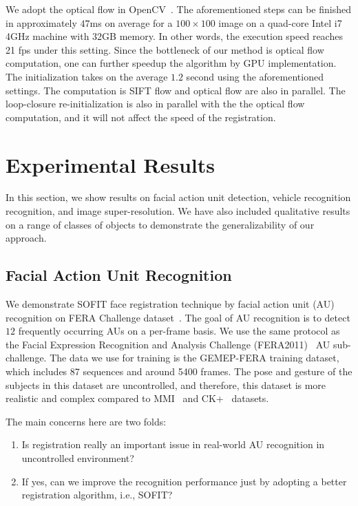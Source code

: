 \documentclass[10pt,journal]{IEEEtran}
\begin{document}
We adopt the optical flow in OpenCV~\cite{opencv}. \textcolor[rgb]{1,0,0}{The aforementioned steps can be finished in approximately $47$ms on average for a $100\times100$ image on a quad-core Intel i7 4GHz machine with 32GB memory. In other words, the execution speed reaches 21 fps under this setting. }Since the bottleneck of our method is optical flow computation, one can further speedup the algorithm by GPU implementation. The initialization takes on the average \textcolor[rgb]{1,0,0}{$1.2$} second using the aforementioned settings. The computation is SIFT flow and optical flow are also in parallel. The loop-closure re-initialization is also in parallel with the the optical flow computation, and it will not affect the speed of the registration. 


\section{\label{sec:experiment}Experimental Results}

\textcolor[rgb]{1,0,0}{In this section, we show results on facial action unit detection, vehicle recognition recognition, and image super-resolution. We have also included qualitative results on a range of classes of objects to demonstrate the generalizability of our approach.}

\subsection{Facial Action Unit Recognition}

We demonstrate SOFIT face registration technique by facial action unit (AU) recognition on FERA Challenge dataset~\cite{FERA11}. The goal of AU recognition is to detect $12$ frequently occurring AUs on a per-frame basis. We use the same protocol as the Facial Expression Recognition and Analysis Challenge (FERA2011)~\cite{Valstar_FERA11} AU sub-challenge. The data we use for training is the GEMEP-FERA training dataset, which includes 87 sequences and around 5400 frames. The pose and gesture of the subjects in this dataset are uncontrolled, and therefore, this dataset is more realistic and complex compared to MMI~\cite{Pantic_ICME05} and CK+~\cite{Kanade_FG00} datasets.

The main concerns here are two folds:
\begin{enumerate}
\item Is registration really an important issue in real-world AU recognition in uncontrolled environment?
\item If yes, can we improve the recognition performance just by adopting a better registration algorithm, i.e., SOFIT?
\end{enumerate}
\end{document}
